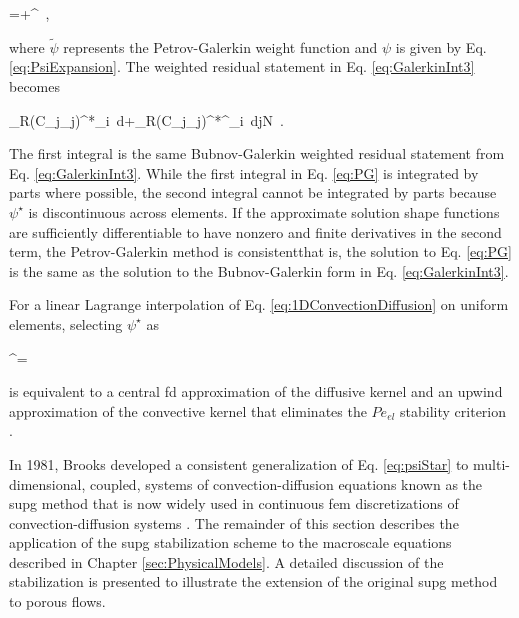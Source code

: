 \beq
\label{eq:pgwf}
\tilde{\psi}=\psi+\psi^\star\ ,
\eeq

\noindent where \(\tilde{\psi}\) represents the Petrov-Galerkin weight function and \(\psi\) is given by Eq. \eqref{eq:PsiExpansion}. The weighted residual statement in Eq. \eqref{eq:GalerkinInt3} becomes

\beq
\label{eq:PG}
\int_{\Omega}\left\lbrack R\left(C_j\phi_j\right)\right\rbrack^*\phi_i\ d\Omega+\int_{\Omega}\left\lbrack R\left(C_j\phi_j\right)\right\rbrack^*\psi^\star_i\ d\hspace{1cm}j\in N\ .
\eeq

\noindent The first integral is the same Bubnov-Galerkin weighted residual statement from Eq. \eqref{eq:GalerkinInt3}. While the first integral in Eq. \eqref{eq:PG} is integrated by parts where possible, the second integral cannot be integrated by parts because \(\psi^\star\) is discontinuous across elements. If the approximate solution shape functions are sufficiently differentiable to have nonzero and finite derivatives in the second term, the Petrov-Galerkin method is consistent\mdash that is, the solution to Eq. \eqref{eq:PG} is the same as the solution to the Bubnov-Galerkin form in Eq. \eqref{eq:GalerkinInt3}.

For a linear Lagrange interpolation of Eq. \eqref{eq:1DConvectionDiffusion} on uniform elements, selecting \(\psi^\star\) as

\beq
\label{eq:psiStar}
\psi^\star=\cdot\nabla\psi\ 
\eeq

\noindent is equivalent to a central \gls{fd} approximation of the diffusive kernel and an upwind approximation of the convective kernel that eliminates the \(Pe_{el}\) stability criterion \cite{zienkiewicz,brooks,novak_manual}. 

In 1981, Brooks developed a consistent generalization of Eq. \eqref{eq:psiStar} to multi-dimensional, coupled, systems of convection-diffusion equations known as the \gls{supg} method that is now widely used in continuous \gls{fem} discretizations of convection-diffusion systems \cite{hauke,tezduyar,kirk,hauke_1998,TH1983,tezduyar1983,zienkiewicz,StabilizationReview}. The remainder of this section describes the application of the \gls{supg} stabilization scheme to the macroscale equations described in Chapter \ref{sec:PhysicalModels}. A detailed discussion of the stabilization is presented to illustrate the extension of the original \gls{supg} method to porous flows. 

